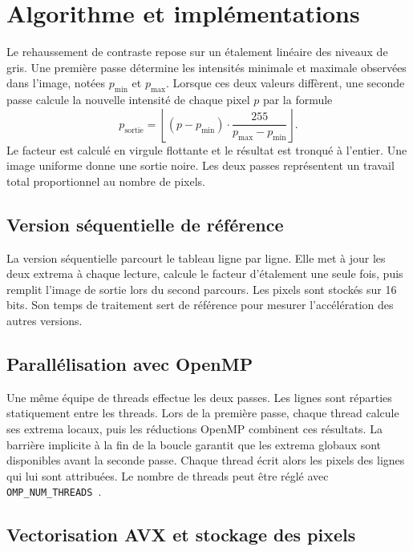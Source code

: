 \section{Algorithme et implémentations}

Le rehaussement de contraste repose sur un étalement linéaire des niveaux de gris. Une première passe détermine les intensités minimale et maximale observées dans l'image, notées \(p_{\min}\) et \(p_{\max}\). Lorsque ces deux valeurs diffèrent, une seconde passe calcule la nouvelle intensité de chaque pixel \(p\) par la formule
\[
    p_{\mathrm{sortie}} =
    \left\lfloor (p - p_{\min}) \cdot \frac{255}{p_{\max} - p_{\min}} \right\rfloor .
\]
Le facteur est calculé en virgule flottante et le résultat est tronqué à l'entier. Une image uniforme donne une sortie noire. Les deux passes représentent un travail total proportionnel au nombre de pixels.

\subsection{Version séquentielle de référence}

La version séquentielle parcourt le tableau ligne par ligne. Elle met à jour les deux extrema à chaque lecture, calcule le facteur d'étalement une seule fois, puis remplit l'image de sortie lors du second parcours. Les pixels sont stockés sur 16 bits. Son temps de traitement sert de référence pour mesurer l'accélération des autres versions.

\subsection{Parallélisation avec OpenMP}

Une même équipe de threads effectue les deux passes. Les lignes sont réparties statiquement entre les threads. Lors de la première passe, chaque thread calcule ses extrema locaux, puis les réductions OpenMP combinent ces résultats. La barrière implicite à la fin de la boucle garantit que les extrema globaux sont disponibles avant la seconde passe. Chaque thread écrit alors les pixels des lignes qui lui sont attribuées. Le nombre de threads peut être réglé avec \verb|OMP_NUM_THREADS|~\cite{openmp}.

\subsection{Vectorisation AVX et stockage des pixels}

